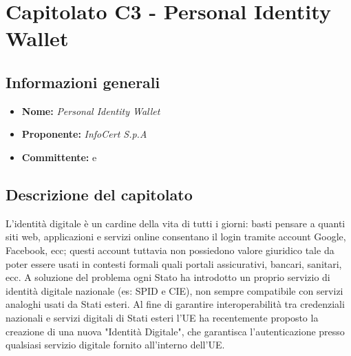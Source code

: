 \section{Capitolato C3 - Personal Identity Wallet}\label{section:c3}

\subsection{Informazioni generali}
    \begin{itemize}
        \item \textbf{Nome:} \textit{Personal Identity Wallet}
        \item \textbf{Proponente:} \textit{InfoCert S.p.A}
        \item \textbf{Committente:} \commitNameM{} e \commitNameS{}
    \end{itemize}

\subsection{Descrizione del capitolato}
L’identità digitale è un cardine della vita di tutti i giorni: basti pensare a quanti siti web, applicazioni e servizi online consentano il login tramite account Google, Facebook, ecc; questi account tuttavia non possiedono valore giuridico tale da poter essere usati in contesti formali quali portali assicurativi, bancari, sanitari, ecc. A soluzione del problema ogni Stato ha introdotto un proprio servizio di identità digitale nazionale (es: SPID e CIE), non sempre compatibile con servizi analoghi usati da Stati esteri.\newline
Al fine di garantire interoperabilità tra credenziali nazionali e servizi digitali di Stati esteri l’UE ha recentemente proposto la creazione di una nuova "Identità Digitale", che garantisca l’autenticazione presso qualsiasi servizio digitale fornito all’interno dell’UE.


